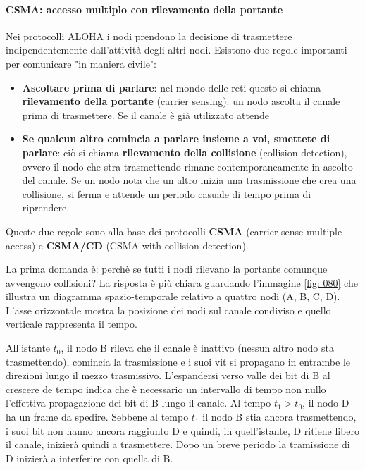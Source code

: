 \documentclass[11pt,a4paper]{article}
\begin{document}
\paragraph{CSMA: accesso multiplo con rilevamento della portante}
Nei protocolli ALOHA i nodi prendono la decisione di trasmettere indipendentemente dall'attività degli altri nodi. Esistono due regole importanti per comunicare "in maniera civile":
\begin{itemize}
	\item \textbf{Ascoltare prima di parlare}: nel mondo delle reti questo si chiama \textbf{rilevamento della portante} (carrier sensing): un nodo ascolta il canale prima di trasmettere. Se il canale è già utilizzato attende
	\item \textbf{Se qualcun altro comincia a parlare insieme a voi, smettete di parlare}: ciò si chiama \textbf{rilevamento della collisione} (collision detection), ovvero il nodo che stra trasmettendo rimane contemporaneamente in ascolto del canale. Se un nodo nota che un altro inizia una trasmissione che crea una collisione, si ferma e attende un periodo casuale di tempo prima di riprendere.
\end{itemize}
Queste due regole sono alla base dei protocolli \textbf{CSMA} (carrier sense multiple access) e \textbf{CSMA/CD} (CSMA with collision detection).

La prima domanda è: perchè se tutti i nodi rilevano la portante comunque avvengono collisioni? La risposta è più chiara guardando l'immagine \ref{fig: 080} che illustra un diagramma spazio-temporale relativo a quattro nodi (A, B, C, D). L'asse orizzontale mostra la posizione dei nodi sul canale condiviso e quello verticale rappresenta il tempo.

All'istante $t_{0}$, il nodo B rileva che il canale è inattivo (nessun altro nodo sta trasmettendo), comincia la trasmissione e i suoi vit si propagano in entrambe le direzioni lungo il mezzo trasmissivo. L'espandersi verso valle dei bit di B al crescere de tempo indica che è necessario un intervallo di tempo non nullo l'effettiva propagazione dei bit di B lungo il canale. Al tempo $t_{1} > t_{0}$, il nodo D ha un frame da spedire. Sebbene al tempo $t_{1}$ il nodo B stia ancora trasmettendo, i suoi bit non hanno ancora raggiunto D e quindi, in quell'istante, D ritiene libero il canale, inizierà quindi a trasmettere. Dopo un breve periodo la tramissione di D inizierà a interferire con quella di B.
\end{document}

